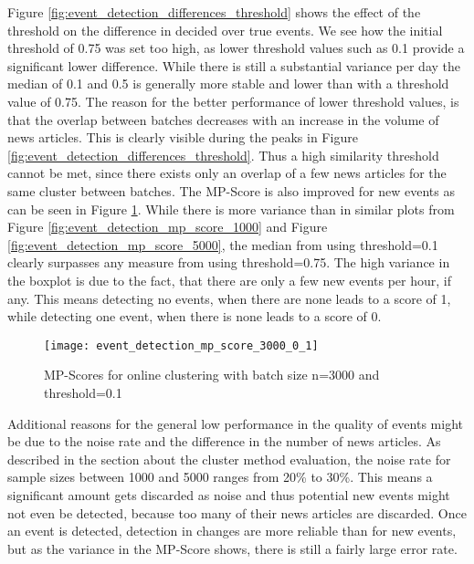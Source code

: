Figure \ref{fig:event_detection_differences_threshold} shows the effect of the threshold on the difference in decided over true events. We see how the initial threshold of 0.75 was set too high, as lower threshold values such as 0.1 provide a significant lower difference. While there is still a substantial variance per day the median of 0.1 and 0.5 is generally more stable and lower than with a threshold value of 0.75. The reason for the better performance of lower threshold values, is that the overlap between batches decreases with an increase in the volume of news articles. This is clearly visible during the peaks in Figure \ref{fig:event_detection_differences_threshold}. Thus a high similarity threshold cannot be met, since there exists only an overlap of a few news articles for the same cluster between batches. The MP-Score is also improved for new events as can be seen in Figure \ref{fig:event_detection_mp_score_3000_0_1}. While there is more variance than in similar plots from Figure \ref{fig:event_detection_mp_score_1000} and Figure \ref{fig:event_detection_mp_score_5000}, the median from using threshold=0.1 clearly surpasses any measure from using threshold=0.75. The high variance in the boxplot is due to the fact, that there are only a few new events per hour, if any. This means detecting no events, when there are none leads to a score of 1, while detecting one event, when there is none leads to a score of 0.

\begin{figure}[h]
    \centering
    \texttt{[image: event\_detection\_mp\_score\_3000\_0\_1]}
    \caption{MP-Scores for online clustering with batch size n=3000 and threshold=0.1}
    \label{fig:event_detection_mp_score_3000_0_1}
\end{figure}


Additional reasons for the general low performance in the quality of events might be due to the noise rate and the difference in the number of news articles. As described in the section about the cluster method evaluation, the noise rate for sample sizes between 1000 and 5000 ranges from 20\% to 30\%. This means a significant amount gets discarded as noise and thus potential new events might not even be detected, because too many of their news articles are discarded. Once an event is detected, detection in changes are more reliable than for new events, but as the variance in the MP-Score shows, there is still a fairly large error rate.


